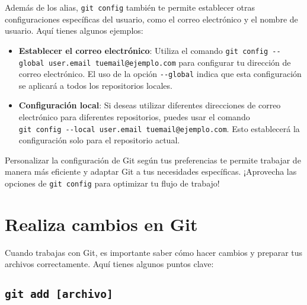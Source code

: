 \documentclass[
  letterpaper,
  DIV=11,
  numbers=noendperiod]{scrartcl}
\begin{document}
Además de los alias, \texttt{git\ config} también te permite establecer
otras configuraciones específicas del usuario, como el correo
electrónico y el nombre de usuario. Aquí tienes algunos ejemplos:

\begin{itemize}
\item
  \textbf{Establecer el correo electrónico}: Utiliza el comando
  \texttt{git\ config\ -\/-global\ user.email\ tuemail@ejemplo.com} para
  configurar tu dirección de correo electrónico. El uso de la opción
  \texttt{-\/-global} indica que esta configuración se aplicará a todos
  los repositorios locales.
\item
  \textbf{Configuración local}: Si deseas utilizar diferentes
  direcciones de correo electrónico para diferentes repositorios, puedes
  usar el comando
  \texttt{git\ config\ -\/-local\ user.email\ tuemail@ejemplo.com}. Esto
  establecerá la configuración solo para el repositorio actual.
\end{itemize}

Personalizar la configuración de Git según tus preferencias te permite
trabajar de manera más eficiente y adaptar Git a tus necesidades
específicas. ¡Aprovecha las opciones de \texttt{git\ config} para
optimizar tu flujo de trabajo!

\hypertarget{realiza-cambios-en-git}{%
\section{Realiza cambios en Git}\label{realiza-cambios-en-git}}

Cuando trabajas con Git, es importante saber cómo hacer cambios y
preparar tus archivos correctamente. Aquí tienes algunos puntos clave:

\hypertarget{git-add-archivo}{%
\subsection{\texorpdfstring{\texttt{git\ add\ {[}archivo{]}}}{git add {[}archivo{]}}}\label{git-add-archivo}}
\end{document}
